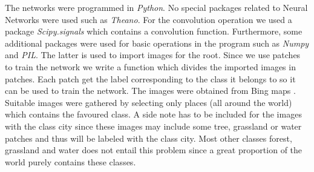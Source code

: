 \documentclass[a4paper,onecolumn]{report}
\begin{document}
The networks were programmed in \textit{Python}. No special packages related to Neural Networks were used such as \textit{Theano}. For the convolution operation we used a package \textit{Scipy.signals} which contains a convolution function. Furthermore, some additional packages were used for basic operations in the program such as \textit{Numpy} and \textit{PIL}. The latter is used to import images for the root. Since we use patches to train the network we write a function which divides the imported images in patches. Each patch get the label corresponding to the class it belongs to so it can be used to train the network. The images were obtained from Bing maps \cite{bing}. Suitable images were gathered by selecting only places (all around the world) which contains the favoured class. A side note has to be included for the images with the class city since these images may include some tree, grassland or water patches and thus will be labeled with the class city. Most other classes forest, grassland and water does not entail this problem since a great proportion of the world purely contains these classes.
\end{document}
